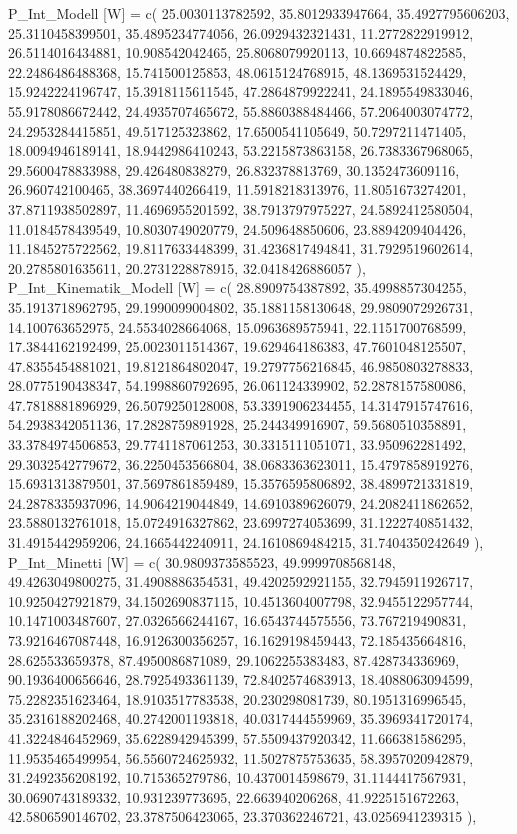 \documentclass[
  letterpaper,
  DIV=11]{scrartcl}
\newenvironment{Shaded}{\begin{snugshade}}{\end{snugshade}}
\newcommand{\NormalTok}[1]{\textcolor[rgb]{0.00,0.23,0.31}{#1}}
\begin{document}
\begin{Shaded}
\begin{Highlighting}[]
\NormalTok{  \textasciigrave{}P\_Int\_Modell [W]\textasciigrave{} = c( 25.0030113782592, 35.8012933947664, 35.4927795606203, 25.3110458399501, 35.4895234774056, 26.0929432321431, 11.2772822919912, 26.5114016434881, 10.908542042465, 25.8068079920113, 10.6694874822585, 22.2486486488368, 15.741500125853, 48.0615124768915, 48.1369531524429, 15.9242224196747, 15.3918115611545, 47.2864879922241, 24.1895549833046, 55.9178086672442, 24.4935707465672, 55.8860388484466, 57.2064003074772, 24.2953284415851, 49.517125323862, 17.6500541105649, 50.7297211471405, 18.0094946189141, 18.9442986410243, 53.2215873863158, 26.7383367968065, 29.5600478833988, 29.426480838279, 26.832378813769, 30.1352473609116, 26.960742100465, 38.3697440266419, 11.5918218313976, 11.8051673274201, 37.8711938502897, 11.4696955201592, 38.7913797975227, 24.5892412580504, 11.0184578439549, 10.8030749020779, 24.509648850606, 23.8894209404426, 11.1845275722562, 19.8117633448399, 31.4236817494841, 31.7929519602614, 20.2785801635611, 20.2731228878915, 32.0418426886057 ),}
\NormalTok{  \textasciigrave{}P\_Int\_Kinematik\_Modell [W]\textasciigrave{} = c( 28.8909754387892, 35.4998857304255, 35.1913718962795, 29.1990099004802, 35.1881158130648, 29.9809072926731, 14.100763652975, 24.5534028664068, 15.0963689575941, 22.1151700768599, 17.3844162192499, 25.0023011514367, 19.629464186383, 47.7601048125507, 47.8355454881021, 19.8121864802047, 19.2797756216845, 46.9850803278833, 28.0775190438347, 54.1998860792695, 26.061124339902, 52.2878157580086, 47.7818881896929, 26.5079250128008, 53.3391906234455, 14.3147915747616, 54.2938342051136, 17.2828759891928, 25.244349916907, 59.5680510358891, 33.3784974506853, 29.7741187061253, 30.3315111051071, 33.950962281492, 29.3032542779672, 36.2250453566804, 38.0683363623011, 15.4797858919276, 15.6931313879501, 37.5697861859489, 15.3576595806892, 38.4899721331819, 24.2878335937096, 14.9064219044849, 14.6910389626079, 24.2082411862652, 23.5880132761018, 15.0724916327862, 23.6997274053699, 31.1222740851432, 31.4915442959206, 24.1665442240911, 24.1610869484215, 31.7404350242649 ),}
\NormalTok{  \textasciigrave{}P\_Int\_Minetti [W]\textasciigrave{} = c( 30.9809373585523, 49.9999708568148, 49.4263049800275, 31.4908886354531, 49.4202592921155, 32.7945911926717, 10.9250427921879, 34.1502690837115, 10.4513604007798, 32.9455122957744, 10.1471003487607, 27.0326566244167, 16.6543744575556, 73.767219490831, 73.9216467087448, 16.9126300356257, 16.1629198459443, 72.185435664816, 28.625533659378, 87.4950086871089, 29.1062255383483, 87.428734336969, 90.1936400656646, 28.7925493361139, 72.8402574683913, 18.4088063094599, 75.2282351623464, 18.9103517783538, 20.230298081739, 80.1951316996545, 35.2316188202468, 40.2742001193818, 40.0317444559969, 35.3969341720174, 41.3224846452969, 35.6228942945399, 57.5509437920342, 11.666381586295, 11.9535465499954, 56.5560724625932, 11.5027875753635, 58.3957020942879, 31.2492356208192, 10.715365279786, 10.4370014598679, 31.1144417567931, 30.0690743189332, 10.931239773695, 22.663940206268, 41.9225151672263, 42.5806590146702, 23.3787506423065, 23.370362246721, 43.0256941239315 ),}

\end{Highlighting}
\end{Shaded}
\end{document}
